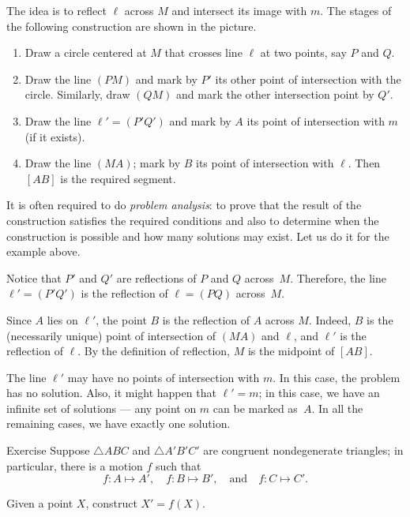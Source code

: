 {The idea is to reflect $\ell$ across $M$ and intersect its image with $m$.
The stages of the following construction are shown in the picture.

\begin{enumerate}[1.]
\item Draw a circle centered at $M$ that crosses line $\ell$ at two points, say $P$ and $Q$.
\item Draw the line $(PM)$ and mark by $P'$ its other point of intersection with the circle.
Similarly, draw $(QM)$ and mark the other intersection point by $Q'$.

\end{enumerate}

}

\pagebreak%

\begin{enumerate}[1.]\setcounter{enumi}{2}
\item Draw the line $\ell'=(P'Q')$ and mark by $A$ its point of intersection with $m$ (if it exists).
\item Draw the line $(MA)$;
mark by $B$ its point of intersection with $\ell$.
Then $[AB]$ is the required segment.
\end{enumerate}

\medskip

It is often required to do \emph{problem analysis}:
to prove that the result of the construction satisfies the required conditions and also to determine when the construction is possible and how many solutions may exist.
Let us do it for the example above.


Notice that $P'$ and $Q'$ are reflections of $P$ and $Q$ across~$M$.
Therefore, the line $\ell'=(P'Q')$ is the reflection of $\ell=(PQ)$ across~$M$.

Since $A$ lies on $\ell'$,
the point $B$ is the reflection of $A$ across $M$.
Indeed, $B$ is the (necessarily unique) point of intersection of $(MA)$ and $\ell$, and $\ell'$ is the reflection of $\ell$.
By the definition of reflection, $M$ is the midpoint of $[AB]$.

The line $\ell'$ may have no points of intersection with $m$.
In this case, the problem has no solution.
Also, it might happen that $\ell'=m$;
in this case, we have an infinite set of solutions --- any point on $m$ can be marked as~$A$.
In all the remaining cases, we have exactly one solution.
\qeds

\begin{thm}{Exercise}\label{ex:motion}
Suppose $\triangle ABC$ and $\triangle A'B'C'$ are congruent nondegenerate triangles;
in particular, there is a motion $f$ such that
\[f\colon A\mapsto A',\quad f\colon B\mapsto B',\quad\text{and}\quad f\colon C\mapsto C'.\]

Given a point $X$, construct $X'=f(X)$.
\end{thm}


